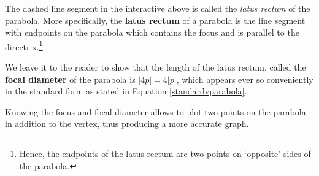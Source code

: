 \documentclass{ximera}
\begin{document}
The dashed line segment in the interactive above is called the \textit{latus rectum} of the parabola.  More specifically, the  \textbf{latus rectum} of a parabola is the line segment with endpoints on the parabola which contains the focus and is parallel to the directrix.\footnote{Hence, the endpoints of the latus rectum are  two points on `opposite' sides of the parabola.}   


 

We leave it to the reader to show  that the length of the latus rectum, called the   \textbf{focal diameter} of the parabola is $|4p| = 4|p|$, which appears ever so conveniently in the standard form as stated in Equation \ref{standardvparabola}.  


 

Knowing the focus and focal diameter allows to plot two points on the parabola in addition to the vertex, thus producing a more accurate graph.
\end{document}
